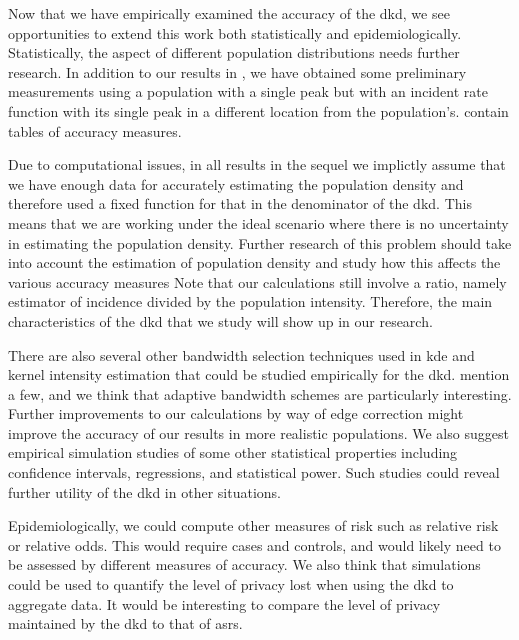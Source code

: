 

Now that we have empirically examined the accuracy of the \gls{dkd},
we see opportunities to extend this work both statistically and epidemiologically.
Statistically,
the aspect of different population distributions needs further research.
In addition to our results in ,
we have obtained some preliminary measurements using a population with a single peak
but with an incident rate function with its single peak in a different location from the population's.
 contain tables of accuracy measures.

Due to computational issues,
in all results in the sequel we implictly assume that we have enough data for accurately estimating the population density and therefore used a fixed function for that in the denominator of the \gls{dkd}.
This means that we are working under the ideal scenario where there is no uncertainty in estimating the population density.
Further research of this problem should take into account the estimation of population density and study how this affects the various accuracy measures
Note that our calculations still involve a ratio, namely estimator of incidence divided by the population intensity.
Therefore, the main characteristics of the \gls{dkd} that we study will show up in our research.

There are also several other bandwidth selection techniques used in \gls{kde}
and \gls{kernel intensity estimation} that could be studied empirically for the \gls{dkd}.
\citet{silverman1986density,wand1994kernel} mention a few,
and we think that adaptive bandwidth schemes are particularly interesting.
Further improvements to our calculations by way of edge correction might improve the accuracy of our results in more realistic populations.
We also suggest empirical simulation studies of some other statistical properties  
including confidence intervals, regressions, and statistical power.
Such studies could reveal further utility of the \gls{dkd} in other situations.

Epidemiologically,
we could compute other measures of risk such as relative risk or relative odds.
This would require cases and controls,
and would likely need to be assessed by different measures of accuracy.
We also think that simulations could be used to quantify the level of privacy lost when using the \gls{dkd} to aggregate data.
It would be interesting to compare the level of privacy maintained by the \gls{dkd} to that of \glspl{asr}.
